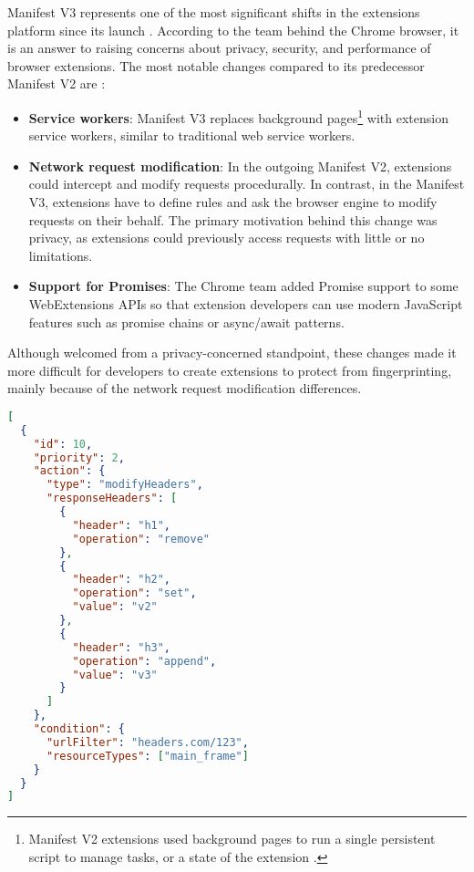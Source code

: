 Manifest V3 represents one of the most significant shifts in the extensions platform since its launch \cite{ChromeManifestV3}. According to the team behind the Chrome browser, it is an answer to raising concerns about privacy, security, and performance of browser extensions. The most notable changes compared to its predecessor Manifest V2 are \cite{ChromeManifestV3}:

\begin{itemize}
	\item \textbf{Service workers}: Manifest V3 replaces background pages\footnote{Manifest V2 extensions used background pages to run a single persistent script to manage tasks, or a state of the extension \cite{ChromeManifestV2}.} with extension service workers, similar to traditional web service workers.
	\item \textbf{Network request modification}: In the outgoing Manifest V2, extensions could intercept and modify requests procedurally. In contrast, in the Manifest V3, extensions have to define rules and ask the browser engine to modify requests on their behalf. The primary motivation behind this change was privacy, as extensions could previously access requests with little or no limitations.
	\item \textbf{Support for Promises}: The Chrome team added Promise support to some WebExtensions APIs so that extension developers can use modern JavaScript features such as promise chains or async/await patterns.
\end{itemize}

Although welcomed from a privacy-concerned standpoint, these changes made it more difficult for developers to create extensions to protect from fingerprinting, mainly because of the network request modification differences.

\bigbreak

\begin{lstlisting}[language={JSON},caption={An example of a declarative rule which modifies selected response headers \cite{ChromeManifestV3}.}, label={Listing:ManifestV3RuleExample}]
[
  {
    "id": 10,
    "priority": 2,
    "action": {
      "type": "modifyHeaders",
      "responseHeaders": [
        {
          "header": "h1",
          "operation": "remove"
        },
        {
          "header": "h2",
          "operation": "set",
          "value": "v2"
        },
        {
          "header": "h3",
          "operation": "append",
          "value": "v3"
        }
      ]
    },
    "condition": {
      "urlFilter": "headers.com/123",
      "resourceTypes": ["main_frame"]
    }
  }
]
\end{lstlisting}

